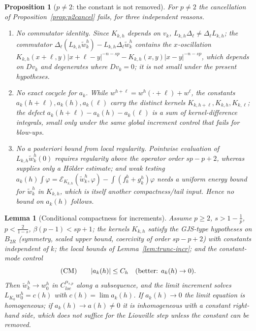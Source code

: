 \documentclass[11pt]{amsart}
\theoremstyle{plain}
\newtheorem{proposition}[theorem]{Proposition}
\newtheorem{lemma}[theorem]{Lemma}
\theoremstyle{definition}
\theoremstyle{remark}
\newcommand{\asp}{\alpha_{s,p}}
\begin{document}
\begin{proposition}[$p\neq2$: the constant is not removed]\label{prop:pneq2}
For $p\neq2$ the cancellation of Proposition~\ref{prop:p2cancel} fails, for
three independent reasons.
\begin{enumerate}[leftmargin=2em]
\item \emph{No commutator identity.} Since $K_{k,h}$ depends on $v_k$,
$L_{k,h}\Delta_\ell\neq\Delta_\ell L_{k,h}$; the commutator
$\Delta_\ell(L_{k,h}\tilde w_k^h)-L_{k,h}\Delta_\ell\tilde w_k^h$ contains the
$x$-oscillation $K_{k,h}(x+\ell,y)|x+\ell-y|^{-n-sp}-K_{k,h}(x,y)|x-y|^{-n-sp}$,
which depends on $Dv_k$ and degenerates where $Dv_k=0$; it is not small under
the present hypotheses.
\item \emph{No exact cocycle for $a_k$.} While $w^{h+\ell}=w^h(\cdot+\ell)+w^\ell$,
the constants $a_k(h+\ell),a_k(h),a_k(\ell)$ carry the distinct kernels
$K_{k,h+\ell},K_{k,h},K_{k,\ell}$; the defect $a_k(h+\ell)-a_k(h)-a_k(\ell)$ is
a sum of kernel-difference integrals, small only under the same global
increment control that fails for blow-ups.
\item \emph{No a posteriori bound from local regularity.} Pointwise evaluation
of $L_{k,h}\tilde w_k^h(0)$ requires regularity above the operator order
$sp-p+2$, whereas \cite[\S7]{GJS} supplies only a H\"older estimate; and weak
testing $a_k(h)\int\varphi=\mathcal E_{K_{k,h}}(\tilde w_k^h,\varphi)-\int(f_k^h+g_k^h)\varphi$
needs a \emph{uniform energy bound} for $\tilde w_k^h$ in $K_{k,h}$, which is
itself another compactness/tail input. Hence no bound on $a_k(h)$ follows.
\end{enumerate}
\end{proposition}

\begin{lemma}[Conditional compactness for increments]\label{lem:truncdiff}
Assume $p\ge2$, $s>1-\frac1p$, $p<\frac2{1-s}$, $\beta(p-1)<sp+1$; the kernels
$K_{k,h}$ satisfy the GJS-type hypotheses on $B_{2R}$ \textnormal{(}symmetry,
scaled upper bound, coercivity of order $sp-p+2$\textnormal{)} with constants
independent of $k$; the local bounds of Lemma~\ref{lem:trunc-incr}; and the
\emph{constant-mode control}
\[
  \textnormal{(CM)}\qquad |a_k(h)|\le C_h\quad\text{(better: }a_k(h)\to0\text{)}.
\]
Then $\tilde w_k^h\to w_0^h$ in $C^{\asp}_{loc}$ along a subsequence, and the
limit increment solves $L_{K_0}w_0^h=c(h)$ with $c(h)=\lim a_k(h)$. If
$a_k(h)\to0$ the limit equation is homogeneous; if $a_k(h)\to a(h)\neq0$ it is
inhomogeneous with a constant right-hand side, which does \emph{not} suffice for
the Liouville step unless the constant can be removed.
\end{lemma}
\end{document}
